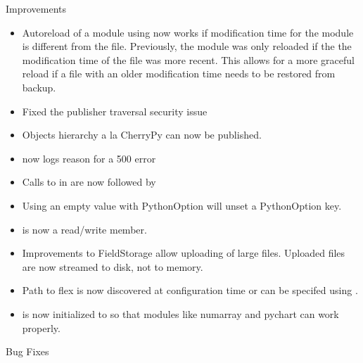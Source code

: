   Improvements

  \begin{itemize}
    \item
      Autoreload of a module using  now works if
      modification time for the module is different from the file.
      Previously, the module was only reloaded if the the modification 
      time of the file was more recent. This allows for a more graceful
      reload if a file with an older modification time needs to be
      restored from backup.
    \item
      Fixed the publisher traversal security issue
    \item
      Objects hierarchy a la CherryPy can now be published.
    \item
       now logs reason for a 500 error
    \item
      Calls to  in  are now followed by 
    \item
      Using an empty value with PythonOption will unset a PythonOption key.
    \item
       is now a read/write member.
    \item
      Improvements to FieldStorage allow uploading of large files. Uploaded
      files are now streamed to disk, not to memory.
    \item
      Path to flex is now discovered at configuration time or can be
      specifed using .
    \item
       is now initialized to  so that modules
      like numarray and pychart can work properly.
  \end{itemize}

  Bug Fixes

